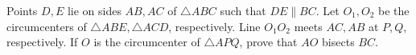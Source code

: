 Points $D,E$ lie on sides $AB,AC$ of $\triangle{ABC}$ such that $DE\parallel BC$. Let $O_1,O_2$ be the circumcenters of $\triangle{ABE},\triangle{ACD}$, respectively. Line $O_1O_2$ meets $AC,AB$ at $P,Q$, respectively. If $O$ is the circumcenter of $\triangle{APQ}$, prove that $AO$ bisects $BC$.
